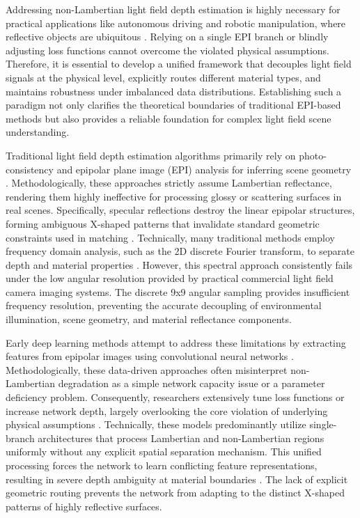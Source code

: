\documentclass[lettersize,journal]{IEEEtran}
\begin{document}
Addressing non-Lambertian light field depth estimation is highly necessary for practical applications like autonomous driving and robotic manipulation, where reflective objects are ubiquitous \cite{autonomous}. Relying on a single EPI branch or blindly adjusting loss functions cannot overcome the violated physical assumptions. Therefore, it is essential to develop a unified framework that decouples light field signals at the physical level, explicitly routes different material types, and maintains robustness under imbalanced data distributions. Establishing such a paradigm not only clarifies the theoretical boundaries of traditional EPI-based methods but also provides a reliable foundation for complex light field scene understanding.

Traditional light field depth estimation algorithms primarily rely on photo-consistency and epipolar plane image (EPI) analysis for inferring scene geometry \cite{epiepi}. Methodologically, these approaches strictly assume Lambertian reflectance, rendering them highly ineffective for processing glossy or scattering surfaces in real scenes. Specifically, specular reflections destroy the linear epipolar structures, forming ambiguous X-shaped patterns that invalidate standard geometric constraints used in matching \cite{xx}. Technically, many traditional methods employ frequency domain analysis, such as the 2D discrete Fourier transform, to separate depth and material properties \cite{dd}. However, this spectral approach consistently fails under the low angular resolution provided by practical commercial light field camera imaging systems. The discrete 9x9 angular sampling provides insufficient frequency resolution, preventing the accurate decoupling of environmental illumination, scene geometry, and material reflectance components.

Early deep learning methods attempt to address these limitations by extracting features from epipolar images using convolutional neural networks \cite{earlyearly}. Methodologically, these data-driven approaches often misinterpret non-Lambertian degradation as a simple network capacity issue or a parameter deficiency problem. Consequently, researchers extensively tune loss functions or increase network depth, largely overlooking the core violation of underlying physical assumptions \cite{lossloss}. Technically, these models predominantly utilize single-branch architectures that process Lambertian and non-Lambertian regions uniformly without any explicit spatial separation mechanism. This unified processing forces the network to learn conflicting feature representations, resulting in severe depth ambiguity at material boundaries \cite{singlesingl}. The lack of explicit geometric routing prevents the network from adapting to the distinct X-shaped patterns of highly reflective surfaces.
\end{document}
